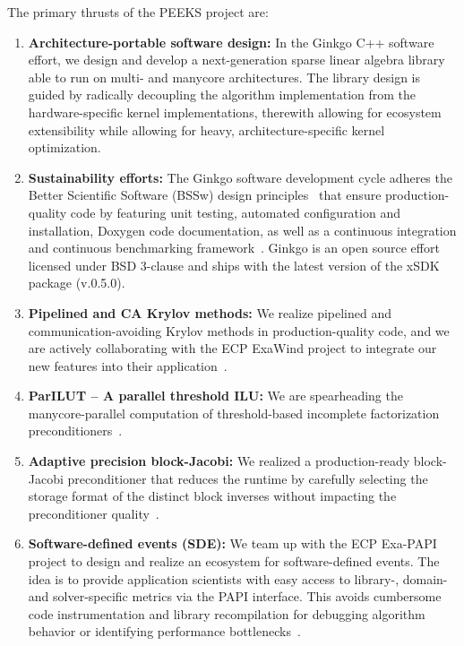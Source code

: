 The primary thrusts of the PEEKS project are:
\begin{enumerate}
    \item \textbf{Architecture-portable software design:}
	In the Ginkgo C++ software effort, we design and develop a next-generation 
	sparse linear algebra library able to run on multi- and manycore 
	architectures. The library design is guided by radically decoupling the 
	algorithm implementation from the hardware-specific kernel implementations, 
	therewith allowing for ecosystem extensibility while allowing for heavy, 
	architecture-specific kernel optimization. 
   \item \textbf{Sustainability efforts:}
	The Ginkgo software development cycle adheres the Better Scientific 
	Software (BSSw) design principles~\cite{betterscientificsoftware} that 
	ensure production-quality code by featuring unit testing, automated 
	configuration and installation, Doxygen code documentation, as well as a 
	continuous integration and continuous benchmarking 
	framework~\cite{pasc_anzt}. Ginkgo is an 
	open source effort licensed under BSD 3-clause and ships with the latest 
	version of the xSDK package (v.0.5.0). 
   \item \textbf{Pipelined and CA Krylov methods:} 
    We realize pipelined and 
	communication-avoiding Krylov methods in production-quality code, and 
	we are actively collaborating with the ECP ExaWind project to integrate 
        our new features into their application~\cite{Yamazaki-lowsynch}. 
	\item \textbf{ParILUT -- A parallel threshold ILU:}  We are spearheading 
	the manycore-parallel computation of threshold-based 
	incomplete factorization preconditioners~\cite{sisc_anzt,ipdps_anzt}. 
	\item \textbf{Adaptive precision block-Jacobi:}  We realized a 
	production-ready block-Jacobi preconditioner that reduces the runtime by 
	carefully selecting the storage format of the distinct block inverses 
	without impacting the preconditioner quality~\cite{toms_anzt}. 
   \item \textbf{Software-defined events (SDE):}  We team up with the ECP 
    Exa-PAPI project to design and realize an ecosystem for software-defined 
    events. The idea is to provide application scientists with easy access 
    to library-, domain- and solver-specific metrics via the PAPI interface. 
    This avoids cumbersome code instrumentation and library recompilation for 
    debugging algorithm behavior or identifying performance 
    bottlenecks~\cite{doi:10.1177/1094342019846287}. 
\end{enumerate}


